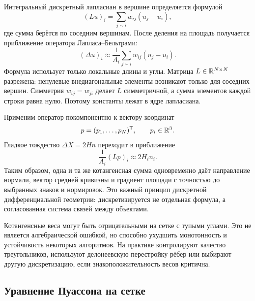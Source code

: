 Интегральный дискретный лапласиан в вершине определяется формулой
\begin{equation}
\label{eq:integrated-cotan-laplacian}
(Lu)_i
=\sum_{j\sim i}w_{ij}(u_j-u_i),
\end{equation}
где сумма берётся по соседним вершинам. После деления на площадь получается приближение оператора Лапласа--Бельтрами:
\begin{equation}
\label{eq:pointwise-cotan-laplacian}
(\Delta u)_i
\approx
\frac{1}{A_i}
\sum_{j\sim i}w_{ij}(u_j-u_i).
\end{equation}
Формула использует только локальные длины и углы. Матрица \(L\in\mathbb{R}^{N\times N}\) разрежена: ненулевые внедиагональные элементы возникают только для соседних вершин. Симметрия \(w_{ij}=w_{ji}\) делает \(L\) симметричной, а сумма элементов каждой строки равна нулю. Поэтому константы лежат в ядре лапласиана.

Применим оператор покомпонентно к вектору координат
\[
p=(p_1,\ldots,p_N)^{\mathsf{T}},
\qquad p_i\in\mathbb{R}^3.
\]
Гладкое тождество \(\Delta X=2Hn\) переходит в приближение
\begin{equation}
\label{eq:discrete-mean-curvature-normal}
\frac{1}{A_i}(Lp)_i
\approx 2H_i n_i.
\end{equation}
Таким образом, одна и та же котангенсная сумма одновременно даёт направление нормали, вектор средней кривизны и градиент площади с точностью до выбранных знаков и нормировок. Это важный принцип дискретной дифференциальной геометрии: дискретизируется не отдельная формула, а согласованная система связей между объектами.

Котангенсные веса могут быть отрицательными на сетке с тупыми углами. Это не является алгебраической ошибкой, но способно ухудшить монотонность и устойчивость некоторых алгоритмов. На практике контролируют качество треугольников, используют делонеевскую перестройку рёбер или выбирают другую дискретизацию, если знакоположительность весов критична.

\subsection{Уравнение Пуассона на сетке}

